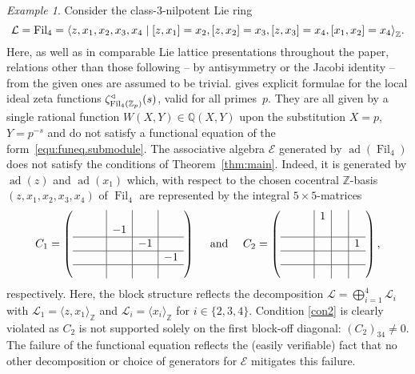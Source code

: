 \documentclass[11pt]{amsart}
\numberwithin{equation}{section}
\numberwithin{figure}{section}
\theoremstyle{plain}
\theoremstyle{definition}
\theoremstyle{remark}
\newtheorem{example}[theorem]{Example}
\begin{document}
\begin{example}\label{exa:Fil4}
  Consider the class-$3$-nilpotent Lie ring
$${\ensuremath{\mathcal{L}}} = \textup{Fil}_4 = {\langle} z,x_1,x_2,x_3,x_4 \mid [z,x_1] = x_2,
  [z,x_2]=x_3,[z,x_3]=x_4,[x_1,x_2]=x_4{\rangle}_{\ensuremath{\mathbb{Z}}}.$$ Here, as well as in
  comparable Lie lattice presentations throughout the paper, relations
  other than those following -- by antisymmetry or the Jacobi identity
  -- from the given ones are assumed to be
  trivial. \cite[Theorem~2.39]{duSWoodward/08} gives explicit formulae
  for the local ideal zeta functions
  $\zeta^{\triangleleft}_{\textup{Fil}_4({\ensuremath{\mathbb{Z}_p}})}(s)$, valid for all
  primes~$p$. They are all given by a single rational function
  $W(X,Y)\in{\ensuremath{\mathbb{Q}}}(X,Y)$ upon the substitution $X=p$, $Y=p^{-s}$ and do
  not satisfy a functional equation of the
  form~\eqref{equ:funeq.submodule}. The associative algebra ${\mathcal{E}}$
  generated by $\operatorname{ad}(\operatorname{Fil}_{4})$ does not satisfy the conditions of
  Theorem~\ref{thm:main}. Indeed, it is generated by $\operatorname{ad}(z)$ and
  $\operatorname{ad}(x_1)$ which, with respect to the chosen cocentral ${\ensuremath{\mathbb{Z}}}$-basis
  $(z,x_1,x_2,x_3,x_4)$ of $\operatorname{Fil}_4$ are represented by the integral
  $5\times 5$-matrices
$$C_1 = \left( \begin{array}{cc|c|c|c}
  \phantom{0}&\phantom{0}&&&\\&&-1&&\\\hline &&&-1& \\ \hline
  &&&&-1\\\hline&&&&\end{array}\right)\quad \textup{ and } \quad C_2 =
\left( \begin{array}{cc|c|c|c}
  \phantom{0}&\phantom{0}&1&&\\&&&&\\\hline &&&\phantom{0}&1\\\hline
  &&&&\\\hline&&&&\end{array}\right),$$ respectively. Here, the block
structure reflects the decomposition ${\ensuremath{\mathcal{L}}} = \bigoplus_{i=1}^4 {\ensuremath{\mathcal{L}}}_i$
with ${\ensuremath{\mathcal{L}}}_1 = {\langle} z,x_1{\rangle}_{\ensuremath{\mathbb{Z}}}$ and ${\ensuremath{\mathcal{L}}}_i = {\langle} x_i{\rangle}_{\ensuremath{\mathbb{Z}}}$ for
$i\in\{2,3,4\}$. Condition \ref{con2} is clearly violated as $C_2$ is
not supported solely on the first block-off diagonal: $(C_2)_{34}\neq
0$. The failure of the functional equation reflects the (easily
verifiable) fact that no other decomposition or choice of generators
for ${\mathcal{E}}$ mitigates this failure.
\end{example}
\end{document}
